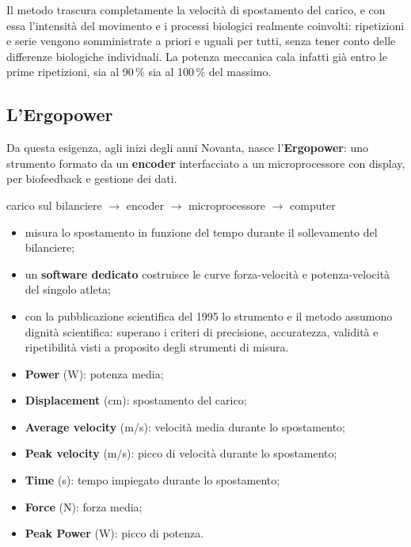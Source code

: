 Il metodo trascura completamente la velocità di spostamento del carico, e con essa l'intensità del
  movimento e i processi biologici realmente coinvolti: ripetizioni e serie vengono somministrate a
  priori e uguali per tutti, senza tener conto delle differenze biologiche individuali. La potenza
  meccanica cala infatti già entro le prime ripetizioni, sia al 90\,\% sia al 100\,\% del massimo.

\subsection{L'Ergopower}

Da questa esigenza, agli inizi degli anni Novanta, nasce l'\textbf{Ergopower}: uno strumento formato
  da un \textbf{encoder} interfacciato a un microprocessore con display, per biofeedback e gestione
  dei dati.

\begin{center}
carico sul bilanciere $\rightarrow$ encoder $\rightarrow$ microprocessore $\rightarrow$ computer
\end{center}

\begin{itemize}
  \item misura lo spostamento in funzione del tempo durante il sollevamento del bilanciere;
  \item un \textbf{software dedicato} costruisce le curve forza-velocità e potenza-velocità del
    singolo atleta;
  \item con la pubblicazione scientifica del 1995 lo strumento e il metodo assumono dignità
    scientifica: superano i criteri di precisione, accuratezza, validità e ripetibilità visti a
    proposito degli strumenti di misura.
\end{itemize}

\begin{itemize}
  \item \textbf{Power} (W): potenza media;
  \item \textbf{Displacement} (cm): spostamento del carico;
  \item \textbf{Average velocity} (m/s): velocità media durante lo spostamento;
  \item \textbf{Peak velocity} (m/s): picco di velocità durante lo spostamento;
  \item \textbf{Time} (s): tempo impiegato durante lo spostamento;
  \item \textbf{Force} (N): forza media;
  \item \textbf{Peak Power} (W): picco di potenza.
\end{itemize}

